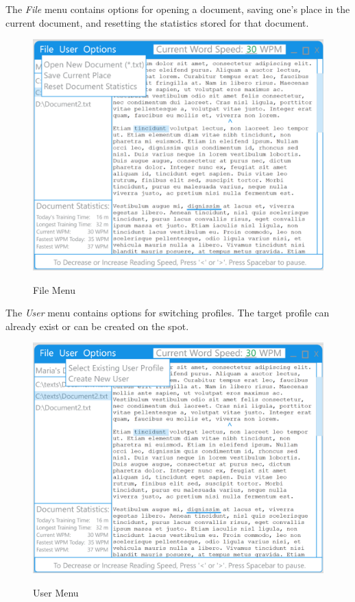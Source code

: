 \documentclass{article}
\begin{document}
{	\clearpage

	The \textit{File} menu contains options for opening a document, saving one's place in the current document, and resetting the statistics stored for that document.\\

	\begin{figure}[!htb]
		\centering
		\includegraphics[scale=.7]{FileMenu.png}
		\label{fig:fig4}
		\caption{File Menu}
	\end{figure}

	\clearpage

	The \textit{User} menu contains options for switching profiles. The target profile can already exist or can be created on the spot.\\

	\begin{figure}[!htb]
		\centering
		\includegraphics[scale=.7]{UserMenu.png}
		\label{fig:fig5}
		\caption{User Menu}
	\end{figure}

}
\end{document}
